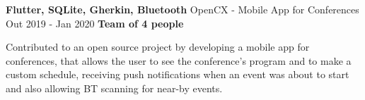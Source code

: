 \cventry
  {\textbf{Flutter, SQLite, Gherkin, Bluetooth}} %
  {OpenCX - Mobile App for Conferences \href{https://github.com/open-cx/open-cx}{\faExternalLink}} %
  {Out 2019 - Jan 2020} %
  {\textbf{Team of 4 people}} %
  {
    \begin{cvitems} %
      \item {Contributed to an open source project by developing a mobile app for conferences, that allows the user to see the conference's program and to make a custom schedule, receiving push notifications when an event was about to start and also allowing BT scanning for near-by events.}
    \end{cvitems}
  }